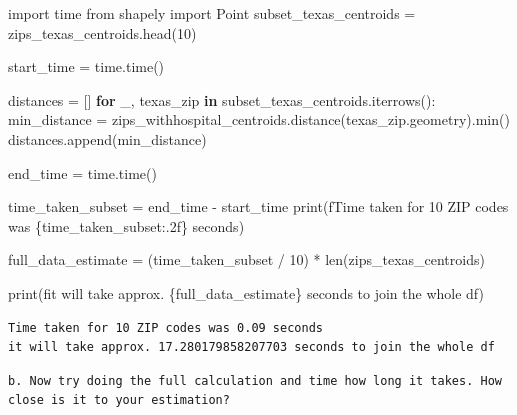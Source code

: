 \documentclass[
  letterpaper,
  DIV=11,
  numbers=noendperiod]{scrartcl}
\newenvironment{Shaded}{\begin{snugshade}}{\end{snugshade}}
\newcommand{\BuiltInTok}[1]{\textcolor[rgb]{0.00,0.23,0.31}{#1}}
\newcommand{\ControlFlowTok}[1]{\textcolor[rgb]{0.00,0.23,0.31}{\textbf{#1}}}
\newcommand{\DecValTok}[1]{\textcolor[rgb]{0.68,0.00,0.00}{#1}}
\newcommand{\ImportTok}[1]{\textcolor[rgb]{0.00,0.46,0.62}{#1}}
\newcommand{\KeywordTok}[1]{\textcolor[rgb]{0.00,0.23,0.31}{\textbf{#1}}}
\newcommand{\NormalTok}[1]{\textcolor[rgb]{0.00,0.23,0.31}{#1}}
\newcommand{\OperatorTok}[1]{\textcolor[rgb]{0.37,0.37,0.37}{#1}}
\newcommand{\SpecialCharTok}[1]{\textcolor[rgb]{0.37,0.37,0.37}{#1}}
\newcommand{\SpecialStringTok}[1]{\textcolor[rgb]{0.13,0.47,0.30}{#1}}
\begin{document}
\begin{Shaded}
\begin{Highlighting}[]
\ImportTok{import}\NormalTok{ time}
\ImportTok{from}\NormalTok{ shapely }\ImportTok{import}\NormalTok{ Point}
\NormalTok{subset\_texas\_centroids }\OperatorTok{=}\NormalTok{ zips\_texas\_centroids.head(}\DecValTok{10}\NormalTok{)}

\NormalTok{start\_time }\OperatorTok{=}\NormalTok{ time.time()}

\NormalTok{distances }\OperatorTok{=}\NormalTok{ []}
\ControlFlowTok{for}\NormalTok{ \_, texas\_zip }\KeywordTok{in}\NormalTok{ subset\_texas\_centroids.iterrows():}
\NormalTok{    min\_distance }\OperatorTok{=}\NormalTok{ zips\_withhospital\_centroids.distance(texas\_zip.geometry).}\BuiltInTok{min}\NormalTok{()}
\NormalTok{    distances.append(min\_distance)}


\NormalTok{end\_time }\OperatorTok{=}\NormalTok{ time.time()}

\NormalTok{time\_taken\_subset }\OperatorTok{=}\NormalTok{ end\_time }\OperatorTok{{-}}\NormalTok{ start\_time}
\BuiltInTok{print}\NormalTok{(}\SpecialStringTok{f\textquotesingle{}Time taken for 10 ZIP codes was }\SpecialCharTok{\{}\NormalTok{time\_taken\_subset}\SpecialCharTok{:.2f\}}\SpecialStringTok{ seconds\textquotesingle{}}\NormalTok{)}

\NormalTok{full\_data\_estimate }\OperatorTok{=}\NormalTok{ (time\_taken\_subset }\OperatorTok{/} \DecValTok{10}\NormalTok{) }\OperatorTok{*} \BuiltInTok{len}\NormalTok{(zips\_texas\_centroids)}

\BuiltInTok{print}\NormalTok{(}\SpecialStringTok{f\textquotesingle{}it will take approx. }\SpecialCharTok{\{}\NormalTok{full\_data\_estimate}\SpecialCharTok{\}}\SpecialStringTok{ seconds to join the whole df\textquotesingle{}}\NormalTok{)}
\end{Highlighting}
\end{Shaded}

\begin{verbatim}
Time taken for 10 ZIP codes was 0.09 seconds
it will take approx. 17.280179858207703 seconds to join the whole df
\end{verbatim}

\begin{verbatim}
b. Now try doing the full calculation and time how long it takes. How close is it to your estimation?
\end{verbatim}
\end{document}
